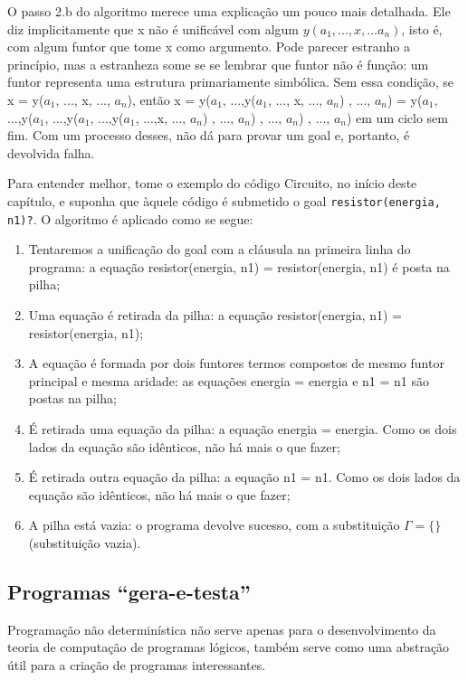 \documentclass{article}
\theoremstyle{remark}
\theoremstyle{theorem}
\begin{document}
O passo 2.b do algoritmo merece uma explicação um pouco mais detalhada. Ele diz implicitamente que x não é unificável com algum $y(a_1, ...,x, ...a_n)$, isto é, com algum funtor que tome x como argumento. Pode parecer estranho a princípio, mas a estranheza some se se lembrar que funtor não é função: um funtor representa uma estrutura primariamente simbólica. Sem essa condição, se x = y($a_1$, ..., x, ..., $a_n$), então x = y($a_1$, ...,y($a_1$, ..., x, ..., $a_n$) , ...,
$a_n$) = y($a_1$, ...,y($a_1$, ...,y($a_1$, ...,y($a_1$,
...,x, ..., $a_n$) , ..., $a_n$) , ..., $a_n$) , ..., $a_n$) em um ciclo sem fim. Com um processo desses, não dá para provar um goal e, portanto, é devolvida falha.

Para entender melhor, tome o exemplo do código Circuito, no início deste capítulo, e suponha que àquele código é submetido o goal {\tt resistor(energia, n1)?}. O algoritmo é aplicado como se segue:

  \begin{enumerate}
    \item Tentaremos a unificação do goal com a cláusula na primeira linha do programa: a equação resistor(energia, n1) = resistor(energia, n1) é posta na pilha;
    \item Uma equação é retirada da pilha: a equação resistor(energia, n1) = resistor(energia, n1);
    \item A equação é formada por dois funtores termos compostos de mesmo funtor principal e mesma aridade: as equações energia  = energia e n1 = n1 são postas na pilha;
    \item É retirada uma equação da pilha: a equação energia = energia. Como os dois lados da equação são idênticos, não há mais o que fazer;
    \item É retirada outra equação da pilha: a equação n1 = n1. Como os dois lados da equação são idênticos, não há mais o que fazer;
    \item A pilha está vazia: o programa devolve sucesso, com a substituição $\Gamma = \{\}$ (substituição vazia).
  \end{enumerate}


  \subsection{Programas ``gera-e-testa''}

  Programação não determinística não serve apenas para o desenvolvimento da teoria de computação de programas lógicos, também serve como uma abstração útil para a criação de programas interessantes.
\end{document}
